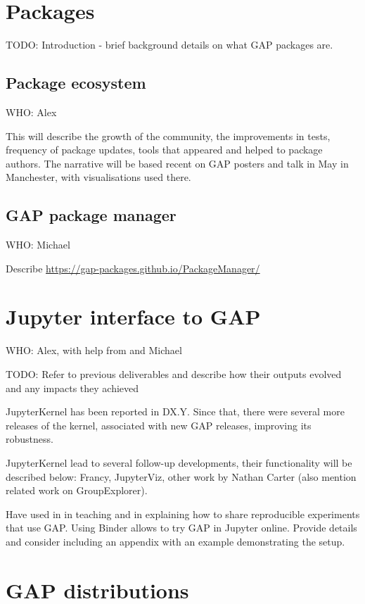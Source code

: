 \documentclass{deliverablereport}
\begin{document}
\section{Packages}

TODO: Introduction - brief background details on what GAP packages are.

\subsection{Package ecosystem}

WHO: Alex

This will describe the growth of the community, the improvements in tests, frequency
of package updates, tools that appeared and helped to package authors. The narrative
will be based recent on GAP posters and talk in May in Manchester, with visualisations
used there.

\subsection{GAP package manager}

WHO: Michael

Describe \url{https://gap-packages.github.io/PackageManager/}


\section{Jupyter interface to GAP}

WHO: Alex, with help from and Michael

TODO: Refer to previous deliverables and describe how their outputs
evolved and any impacts they achieved

JupyterKernel has been reported in DX.Y. Since that, there were
several more releases of the kernel, associated with new GAP
releases, improving its robustness. 

JupyterKernel lead to several follow-up developments, their
functionality will be described below: Francy, JupyterViz,
other work by Nathan Carter (also mention related work on
GroupExplorer).

Have used in in teaching and in explaining how to share 
reproducible experiments that use GAP. Using Binder
allows to try GAP in Jupyter online. Provide details
and consider including an appendix with an example 
demonstrating the setup.

\section{GAP distributions}
\end{document}
